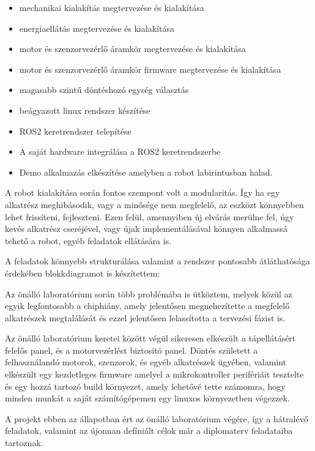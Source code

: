 \begin{itemize}
\item mechanikai kialakítás megtervezése és kialakítása
\item energiaellátás megtervezése és kialakítása
\item motor és szenzorvezérlő áramkör megtervezése és kialakítása
\item motor és szenzorvezérlő áramkör firmware megtervezése és kialakítása
\item magasabb szintű döntéshozó egység választás
\item beágyazott linux rendszer készítése
\item ROS2 keretrendszer telepítése
\item A saját hardware integrálása a ROS2 keretrendszerbe
\item Demo alkalmazás elkészítése amelyben a robot labirintusban halad.
\end{itemize}

A robot kialakítása során fontos szempont volt a modularitás. Így ha egy
alkatrész meghibásodik, vagy a minősége nem megfelelő, az eszközt könnyebben
lehet frissíteni, fejleszteni. Ezen felül, amennyiben új elvárás merülne fel,
úgy kevés alkatrész cseréjével, vagy újak implementálásával könnyen alkalmassá
tehető a robot, egyéb feladatok ellátására is.

A feladatok könnyebb strukturálása valamint a rendszer pontosabb átláthatósága
érdekében blokkdiagramot is készítettem:


Az önálló laboratórium során több problémába is ütköztem, melyek közül az egyik
legfontosabb a chiphiány, amely jelentősen megnehezítette a  megfelelő alkatrészek
megtalálását és ezzel jelentősen lelassította a tervezési fázist is.

Az önálló laboratórium keretei között végül sikeresen elkészült a tápellátásért
felelős panel, és a motorvezérlést biztosító panel. Döntés született a
felhasználandó motorok, szenzorok, és egyéb alkatrészek ügyében, valamint
elkészült egy kezdetleges firmware amelyel a mikrokontroller perifériáit
tesztelte és egy hozzá tartozó build környezet, amely lehetővé tette számomra,
hogy minden munkát a saját számítógépemen egy linuxos környezetben végezzek.

A projekt ebben az állapotban ért az önálló laboratórium végére, így a hátralévő
feladatok, valamint az újonnan defíniált célok már a diplomaterv feladataiba
tartoznak.



